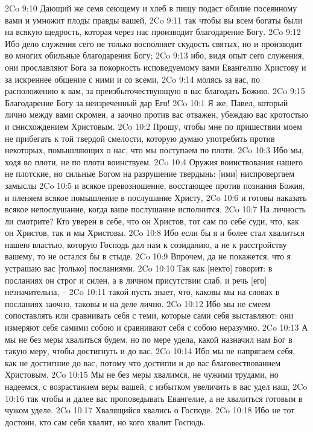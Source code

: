 2Co 9:10  Дающий же семя сеющему и хлеб в пищу подаст обилие посеянному вами и умножит плоды правды вашей,
2Co 9:11  так чтобы вы всем богаты были на всякую щедрость, которая через нас производит благодарение Богу.
2Co 9:12  Ибо дело служения сего не только восполняет скудость святых, но и производит во многих обильные благодарения Богу;
2Co 9:13  ибо, видя опыт сего служения, они прославляют Бога за покорность исповедуемому вами Евангелию Христову и за искреннее общение с ними и со всеми,
2Co 9:14  молясь за вас, по расположению к вам, за преизбыточествующую в вас благодать Божию.
2Co 9:15  Благодарение Богу за неизреченный дар Его!
2Co 10:1  Я же, Павел, который лично между вами скромен, а заочно против вас отважен, убеждаю вас кротостью и снисхождением Христовым.
2Co 10:2  Прошу, чтобы мне по пришествии моем не прибегать к той твердой смелости, которую думаю употребить против некоторых, помышляющих о нас, что мы поступаем по плоти.
2Co 10:3  Ибо мы, ходя во плоти, не по плоти воинствуем.
2Co 10:4  Оружия воинствования нашего не плотские, но сильные Богом на разрушение твердынь: [ими] ниспровергаем замыслы
2Co 10:5  и всякое превозношение, восстающее против познания Божия, и пленяем всякое помышление в послушание Христу,
2Co 10:6  и готовы наказать всякое непослушание, когда ваше послушание исполнится.
2Co 10:7  На личность ли смотрите? Кто уверен в себе, что он Христов, тот сам по себе суди, что, как он Христов, так и мы Христовы.
2Co 10:8  Ибо если бы я и более стал хвалиться нашею властью, которую Господь дал нам к созиданию, а не к расстройству вашему, то не остался бы в стыде.
2Co 10:9  Впрочем, да не покажется, что я устрашаю вас [только] посланиями.
2Co 10:10  Так как [некто] говорит: в посланиях он строг и силен, а в личном присутствии слаб, и речь [его] незначительна, --
2Co 10:11  такой пусть знает, что, каковы мы на словах в посланиях заочно, таковы и на деле лично.
2Co 10:12  Ибо мы не смеем сопоставлять или сравнивать себя с теми, которые сами себя выставляют: они измеряют себя самими собою и сравнивают себя с собою неразумно.
2Co 10:13  А мы не без меры хвалиться будем, но по мере удела, какой назначил нам Бог в такую меру, чтобы достигнуть и до вас.
2Co 10:14  Ибо мы не напрягаем себя, как не достигшие до вас, потому что достигли и до вас благовествованием Христовым.
2Co 10:15  Мы не без меры хвалимся, не чужими трудами, но надеемся, с возрастанием веры вашей, с избытком увеличить в вас удел наш,
2Co 10:16  так чтобы и далее вас проповедывать Евангелие, а не хвалиться готовым в чужом уделе.
2Co 10:17  Хвалящийся хвались о Господе.
2Co 10:18  Ибо не тот достоин, кто сам себя хвалит, но кого хвалит Господь.
